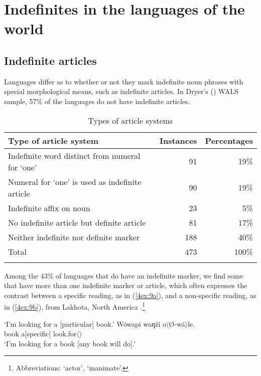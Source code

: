 \documentclass[output=paper]{langsci/langscibook}
\begin{document}
\section{Indefinites in the languages of the world}\label{4sec:2}
\largerpage
\subsection{Indefinite articles}\label{4sec:21}

Languages differ as to whether or not they mark indefinite noun phrases with special morphological means, such as indefinite articles. In Dryer's (\citeyear{dryer:05}) WALS sample, 57\% of the languages do not have indefinite articles.

\begin{table}[b]
\begin{tabularx}{\textwidth}{Xrr}
\lsptoprule
Type of article system & Instances & Percentages \\
\midrule
Indefinite word distinct from numeral for `one' & 91 & 19\% \\
Numeral for `one' is used as indefinite article & 90 & 19\% \\
Indefinite affix on noun & 23 & 5\% \\
No indefinite article but definite article & 81 & 17\% \\
Neither indefinite nor definite marker & 188 & 40\% \\
\midrule
Total & 473 & 100\% \\
\lspbottomrule
\end{tabularx}
\caption{Types of article systems \citep{dryer:05} }\label{4table:1}
\end{table}


Among the 43\% of languages that do have an indefinite marker, we find some that have more than one indefinite marker or article, which often expresses the contrast between a specific reading, as in (\ref{4ex:9a}), and a non-specific reading, as in (\ref{4ex:9b}), from Lakhota, North America \citep[][405]{latrouite:vanvalin:14}.\footnote{Abbreviations: {} `actor', {} `inanimate'. }

\begin{exe}
\ex\label{4ex:9}
	\begin{xlista}
	\glt	`I'm looking for a [particular] book.'
	\ex\label{4ex:9b}
	\gll	Wówapi waƞží             o$\langle$Ø-wá$\rangle$le. \\
		book       a[\minus specific]   look.for$\langle${}$\rangle$ \\
	\glt	`I'm looking for a book [any book will do].'
	\end{xlista}
\end{exe}
\end{document}
